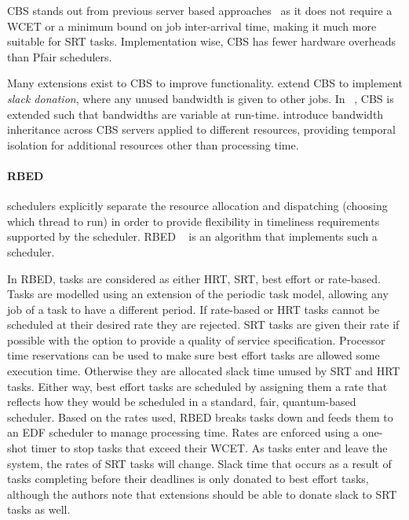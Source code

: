 \gls{CBS} stands out from previous server based approaches~\citep{Spuri_Buttazzo_96, Ghazalie_Baker_95, Spuri_Buttazzo_94, Deng_Liu_97} as it does not require a \gls{WCET} or a minimum bound on job inter-arrival time, making it much more suitable for \gls{SRT} tasks.
Implementation wise, \gls{CBS} has fewer hardware overheads than Pfair schedulers.

Many extensions exist to \gls{CBS} to improve functionality.
\citet{Kato_IR_11} extend \gls{CBS} to implement \emph{slack donation}, where any unused bandwidth is given to other jobs.
In ~\citep{Craciunas_KPRS_12}, \gls{CBS} is extended such that bandwidths are variable at run-time.
\citet{Lamastra_LA_01} introduce bandwidth inheritance across CBS servers applied to different resources, providing temporal isolation for additional resources other than processing time.

\paragraph{\gls{RBED}} schedulers explicitly separate the resource allocation and dispatching (choosing which thread to run) in order to provide flexibility in timeliness requirements supported by the scheduler.
  \Gls{RBED} ~\citep{Brandt_BLB_03} is an algorithm that implements such a scheduler.

In \gls{RBED}, tasks are considered as either \gls{HRT}, \gls{SRT}, best effort or rate-based.
Tasks are modelled using an extension of the periodic task model, allowing any job of a task to have a different period.
If rate-based or \gls{HRT} tasks cannot be scheduled at their desired rate they are rejected.
\gls{SRT} tasks are given their rate if possible with the option to provide a quality of service specification.
Processor time reservations can be used to make sure best effort tasks are allowed some execution time.
Otherwise they are allocated slack time unused by SRT and HRT tasks.
Either way, best effort tasks are scheduled by assigning them a rate that reflects how they would be scheduled in a standard, fair, quantum-based scheduler.
Based on the rates used, \gls{RBED} breaks tasks down and feeds them to an \gls{EDF} scheduler to manage processing time.
Rates are enforced using a one-shot timer to stop tasks that exceed their {\gls{WCET}}.
As tasks enter and leave the system, the rates of \gls{SRT} tasks will change.
Slack time that occurs as a result of tasks completing before their deadlines is only donated to best effort tasks, although the authors note that extensions should be able to donate slack to \gls{SRT} tasks as well.

